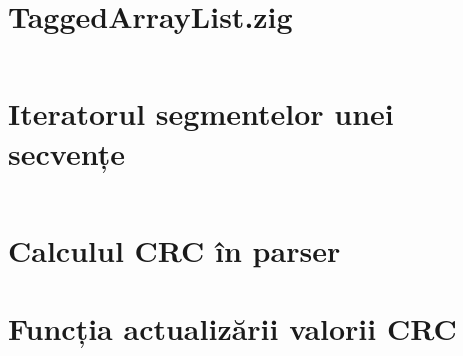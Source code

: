 \documentclass[a4paper,12pt]{report}
\begin{document}

\setcounter{chapter}{1}



\section{TaggedArrayList.zig}\label{appendix:main__TaggedArrayList}
\inputminted{zig}{../src/TaggedArrayList.zig}

\section{Iteratorul segmentelor unei secvențe}\label{appendix:sequence_iterator}
\inputminted[firstline=705, lastline=763]{zig}{../src/parser/pipelines.zig}

\section{Calculul CRC în parser}\label{appendix:crc_sequence_defer_example}

\section{Funcția actualizării valorii CRC}\label{appendix:crc}
\inputminted[firstline=154, lastline=197]{zig}{../src/parser/png/common.zig}

\end{document}
